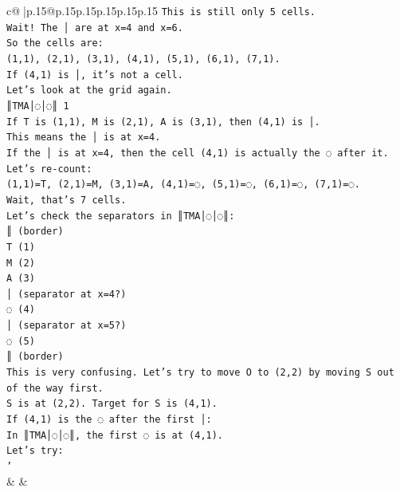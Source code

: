 \documentclass{article}
\begin{document}
{\begin{supertabular}{c@{$\;$}|p{.15\linewidth}@{}p{.15\linewidth}p{.15\linewidth}p{.15\linewidth}p{.15\linewidth}p{.15\linewidth}}
{{{\texttt{This is still only 5 cells.} \\
\texttt{Wait! The │ are at x=4 and x=6.} \\
\texttt{So the cells are:} \\
\texttt{(1,1), (2,1), (3,1), (4,1), (5,1), (6,1), (7,1).} \\
\texttt{If (4,1) is │, it's not a cell.} \\
\texttt{Let's look at the grid again.} \\
\texttt{║TMA│◌│◌║ 1} \\
\texttt{If T is (1,1), M is (2,1), A is (3,1), then (4,1) is │.} \\
\texttt{This means the │ is at x=4.} \\
\texttt{If the │ is at x=4, then the cell (4,1) is actually the ◌ after it.} \\
\texttt{Let's re{-}count:} \\
\texttt{(1,1)=T, (2,1)=M, (3,1)=A, (4,1)=◌, (5,1)=◌, (6,1)=◌, (7,1)=◌.} \\
\texttt{Wait, that's 7 cells.} \\
\texttt{Let's check the separators in ║TMA│◌│◌║:} \\
\texttt{║ (border)} \\
\texttt{T (1)} \\
\texttt{M (2)} \\
\texttt{A (3)} \\
\texttt{│ (separator at x=4?)} \\
\texttt{◌ (4)} \\
\texttt{│ (separator at x=5?)} \\
\texttt{◌ (5)} \\
\texttt{║ (border)} \\
\texttt{This is very confusing. Let's try to move O to (2,2) by moving S out of the way first.} \\
\texttt{S is at (2,2). Target for S is (4,1).} \\
\texttt{If (4,1) is the ◌ after the first │:} \\
\texttt{In ║TMA│◌│◌║, the first ◌ is at (4,1).} \\
\texttt{Let's try:} \\
\texttt{'} \\
            }
        }
    }
    & & \\ \\


\end{supertabular}}
\end{document}
